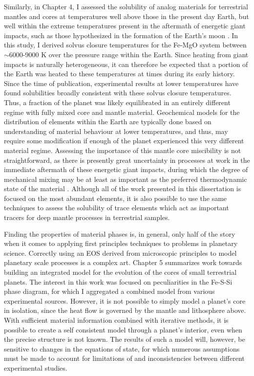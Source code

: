 Similarly, in Chapter 4, I assessed the solubility of analog materials for
terrestrial mantles and cores at temperatures well above those in the present day
Earth, but well within the extreme temperatures present in the aftermath of energetic
giant impacts, such as those hypothesized in the formation of the Earth's moon
\citep{Cuk2012,Canup2012}. In this study, I derived solvus closure temperatures for
the Fe-MgO system between $\sim$6000-9000 K over the pressure range within the Earth.
Since heating from giant impacts is naturally heterogeneous, it can therefore be
expected that a portion of the Earth was heated to these temperatures at times during
its early history. Since the time of publication, experimental results at lower
temperatures \citep{Badro2016} have found solubilities broadly consistent with these
solvus closure temperatures. Thus, a fraction of the planet was likely equilibrated
in an entirely different regime with fully mixed core and mantle material.
Geochemical models for the distribution of elements within the Earth are typically
done based on understanding of material behaviour at lower temperatures, and thus, may
require some modification if enough of the planet experienced this very different
material regime.  Assessing the importance of this mantle core miscibility is not
straightforward, as there is presently great uncertainty in processes at work in the
immediate aftermath of these energetic giant impacts, during which the degree of
mechanical mixing may be at least as important as the preferred thermodynamic state
of the material \citep{Nakajima2014,Deguen2014}. Although all of the work presented
in this dissertation is focused on the most abundant elements, it is also possible to
use the same techniques to assess the solubility of trace elements which act as
important tracers for deep mantle processes in terrestrial samples.

Finding the properties of material phases is, in general, only half of the
story when it comes to applying first principles techniques to problems in planetary
science. Correctly using an EOS derived from microscopic principles to model
planetary scale processes is a complex art. Chapter 5 summarizes work towards
building an integrated model for the evolution of the cores of small terrestrial
planets. The interest in this work was focused on peculiarities in the Fe-S-Si phase
diagram, for which I aggregated a combined model from various experimental sources.
However, it is not possible to simply model a planet's core in isolation, since the
heat flow is governed by the mantle and lithosphere above. With sufficient material
information combined with iterative methods, it is possible to create a self
consistent model through a planet's interior, even when the precise structure is not
known. The results of such a model will, however, be sensitive to changes in the
equations of state, for which numerous assumptions must be made to account for
limitations of and inconsistencies between different experimental studies.

